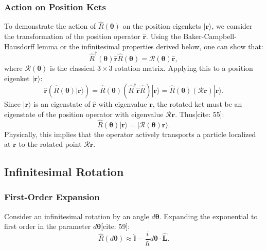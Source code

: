 \subsubsection{Action on Position Kets}
To demonstrate the action of $\hat{R}(\boldsymbol{\theta})$ on the position eigenkets $|\mathbf{r}\rangle$, we consider the transformation of the position operator $\hat{\mathbf{r}}$. Using the Baker-Campbell-Hausdorff lemma or the infinitesimal properties derived below, one can show that:
\begin{equation}
    \hat{R}^\dagger(\boldsymbol{\theta}) \hat{\mathbf{r}} \hat{R}(\boldsymbol{\theta}) = \mathcal{R}(\boldsymbol{\theta}) \hat{\mathbf{r}},
\end{equation}
where $\mathcal{R}(\boldsymbol{\theta})$ is the classical $3\times3$ rotation matrix.
Applying this to a position eigenket $|\mathbf{r}\rangle$:
\begin{equation}
    \hat{\mathbf{r}} \left( \hat{R}(\boldsymbol{\theta}) |\mathbf{r}\rangle \right) = \hat{R}(\boldsymbol{\theta}) \left( \hat{R}^\dagger \hat{\mathbf{r}} \hat{R} \right) |\mathbf{r}\rangle = \hat{R}(\boldsymbol{\theta}) (\mathcal{R} \mathbf{r}) |\mathbf{r}\rangle.
\end{equation}
Since $|\mathbf{r}\rangle$ is an eigenstate of $\hat{\mathbf{r}}$ with eigenvalue $\mathbf{r}$, the rotated ket must be an eigenstate of the position operator with eigenvalue $\mathcal{R}\mathbf{r}$. Thus[cite: 55]:
\begin{equation}
    \hat{R}(\boldsymbol{\theta}) |\mathbf{r}\rangle = |\mathcal{R}(\boldsymbol{\theta})\mathbf{r}\rangle.
\end{equation}
Physically, this implies that the operator actively transports a particle localized at $\mathbf{r}$ to the rotated point $\mathcal{R}\mathbf{r}$.

\subsection{Infinitesimal Rotation}

\subsubsection{First-Order Expansion}
Consider an infinitesimal rotation by an angle $d\boldsymbol{\theta}$. Expanding the exponential to first order in the parameter $d\boldsymbol{\theta}$[cite: 59]:
\begin{equation}
    \hat{R}(d\boldsymbol{\theta}) \approx \hat{\mathbb{I}} - \frac{i}{\hbar} d\boldsymbol{\theta} \cdot \hat{\mathbf{L}}.
\end{equation}

